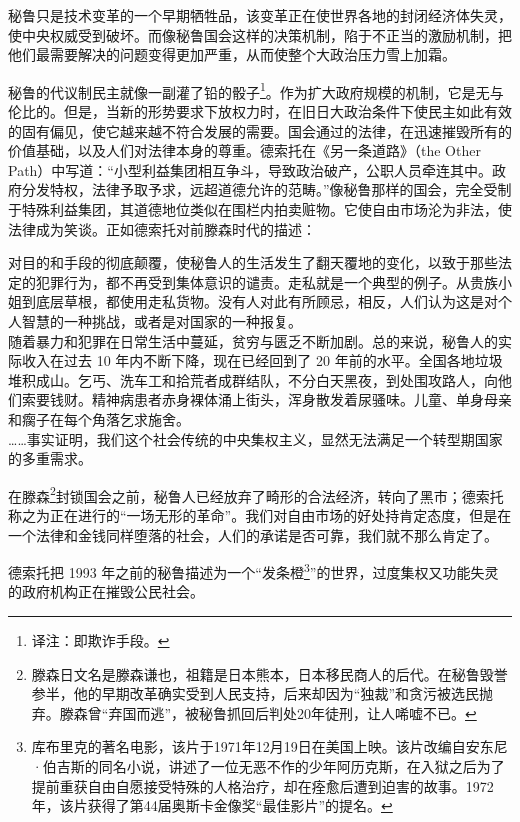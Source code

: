 秘鲁只是技术变革的一个早期牺牲品，该变革正在使世界各地的封闭经济体失灵，使中央权威受到破坏。而像秘鲁国会这样的决策机制，陷于不正当的激励机制，把他们最需要解决的问题变得更加严重，从而使整个大政治压力雪上加霜。

秘鲁的代议制民主就像一副灌了铅的骰子\footnote{译注：即欺诈手段。}。作为扩大政府规模的机制，它是无与伦比的。但是，当新的形势要求下放权力时，在旧日大政治条件下使民主如此有效的固有偏见，使它越来越不符合发展的需要。国会通过的法律，在迅速摧毁所有的价值基础，以及人们对法律本身的尊重。德索托在《另一条道路》（the Other Path）中写道：“小型利益集团相互争斗，导致政治破产，公职人员牵连其中。政府分发特权，法律予取予求，远超道德允许的范畴。”像秘鲁那样的国会，完全受制于特殊利益集团，其道德地位类似在围栏内拍卖赃物。它使自由市场沦为非法，使法律成为笑谈。正如德索托对前滕森时代的描述：


\begin{tcolorbox}
\kaishu 对目的和手段的彻底颠覆，使秘鲁人的生活发生了翻天覆地的变化，以致于那些法定的犯罪行为，都不再受到集体意识的谴责。走私就是一个典型的例子。从贵族小姐到底层草根，都使用走私货物。没有人对此有所顾忌，相反，人们认为这是对个人智慧的一种挑战，或者是对国家的一种报复。\\

随着暴力和犯罪在日常生活中蔓延，贫穷与匮乏不断加剧。总的来说，秘鲁人的实际收入在过去 10 年内不断下降，现在已经回到了 20 年前的水平。全国各地垃圾堆积成山。乞丐、洗车工和拾荒者成群结队，不分白天黑夜，到处围攻路人，向他们索要钱财。精神病患者赤身裸体涌上街头，浑身散发着尿骚味。儿童、单身母亲和瘸子在每个角落乞求施舍。\\

……事实证明，我们这个社会传统的中央集权主义，显然无法满足一个转型期国家的多重需求。
\end{tcolorbox}

在滕森\footnote{滕森日文名是滕森谦也，祖籍是日本熊本，日本移民商人的后代。在秘鲁毁誉参半，他的早期改革确实受到人民支持，后来却因为“独裁”和贪污被选民抛弃。滕森曾“弃国而逃”，被秘鲁抓回后判处20年徒刑，让人唏嘘不已。}封锁国会之前，秘鲁人已经放弃了畸形的合法经济，转向了黑市；德索托称之为正在进行的“一场无形的革命”。我们对自由市场的好处持肯定态度，但是在一个法律和金钱同样堕落的社会，人们的承诺是否可靠，我们就不那么肯定了。

德索托把 1993 年之前的秘鲁描述为一个“发条橙\footnote{库布里克的著名电影，该片于1971年12月19日在美国上映。该片改编自安东尼·伯吉斯的同名小说，讲述了一位无恶不作的少年阿历克斯，在入狱之后为了提前重获自由自愿接受特殊的人格治疗，却在痊愈后遭到迫害的故事。1972年，该片获得了第44届奥斯卡金像奖“最佳影片”的提名。}”的世界，过度集权又功能失灵的政府机构正在摧毁公民社会。

